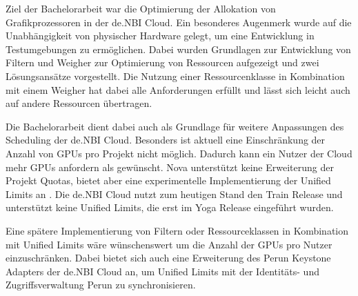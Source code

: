 \documentclass[../Main.tex]{subfiles}
\begin{document}
Ziel der Bachelorarbeit war die Optimierung der Allokation von Grafikprozessoren in der de.NBI Cloud.
Ein besonderes Augenmerk wurde auf die Unabhängigkeit von physischer Hardware gelegt, um
eine Entwicklung in Testumgebungen zu ermöglichen.
Dabei wurden Grundlagen zur Entwicklung von Filtern und Weigher zur Optimierung
von Ressourcen aufgezeigt und zwei Lösungsansätze vorgestellt.
Die Nutzung einer Ressourcenklasse in Kombination mit einem Weigher hat dabei alle Anforderungen
erfüllt und lässt sich leicht auch auf andere Ressourcen übertragen.

Die Bachelorarbeit dient dabei auch als Grundlage für weitere Anpassungen des Scheduling der de.NBI Cloud.
Besonders ist aktuell eine Einschränkung der Anzahl von GPUs pro Projekt nicht möglich. Dadurch kann ein
Nutzer der Cloud mehr GPUs anfordern als gewünscht. Nova unterstützt keine Erweiterung der Projekt Quotas,
bietet aber eine experimentelle Implementierung der Unified Limits an \citep{UnifiedLimits}. Die de.NBI Cloud
nutzt zum heutigen Stand den Train Release und unterstützt keine Unified Limits, die erst im Yoga Release eingeführt wurden.

Eine spätere Implementierung von Filtern oder Ressourceklassen in Kombination mit Unified Limits
wäre wünschenswert um die Anzahl der GPUs pro Nutzer einzuschränken. Dabei bietet sich auch eine Erweiterung
des Perun Keystone Adapters der de.NBI Cloud an, um Unified Limits mit der Identitäts- und Zugriffsverwaltung
Perun zu synchronisieren.

\biblio %
\end{document}
